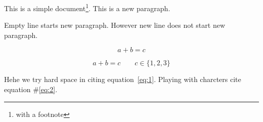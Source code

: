\documentclass[a4paper,12pt]{article} %
\begin{document}
This is a simple
document\footnote{with a footnote}.
This is a new paragraph.

Empty line starts new paragraph. 
However new line does not start new paragraph.

\begin{equation}\label{eq:1}
	a + b =                             c
\end{equation} 

\begin{equation}\label{eq:2}
	a + b = c \ \ \ \ \ \ \ \ \  c \in \{1, 2, 3\}
\end{equation} 

Hehe we try hard space in citing equation~\eqref{eq:1}.  Playing with charcters cite equation \#\ref{eq:2}.
\end{document}
